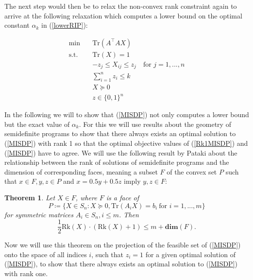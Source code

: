 \documentclass[a4paper,11pt,1p]{elsarticle}
\newtheorem{thm}{Theorem}
\newcommand{\define}{\coloneqq}
\newcommand{\T}{^{\top}}
\newcommand{\Tr}{\text{Tr}}
\newcommand{\Rk}{\text{Rk}}
\begin{document}
The next step would then be to relax the non-convex rank constraint again to arrive at the following relaxation which computes a lower bound on the optimal constant $\alpha_k$ in (\ref{lowerRIP}):

\begin{align}\label{MISDP}
 \min \quad & \Tr(A\T A X) \nonumber \\
 \text{s.t.} \quad & \Tr(X) = 1 \nonumber \\
 & -z_j \leq X_{ij} \leq z_j \quad \text{for } j = 1, ..., n \nonumber \\
 & \sum_{i=1}^n z_i \leq k \tag{MISDP} \\
 & X \succeq 0  \nonumber \\
 & z \in \{0,1\}^n \nonumber
\end{align}

In the following we will to show that (\ref{MISDP}) not only computes a lower bound but the exact value of $\alpha_k$. For this we will use results about the geometry of semidefinite programs to show that there always exists an 
optimal solution to (\ref{MISDP}) with rank 1 so that the optimal objective values of (\ref{Rk1MISDP}) and (\ref{MISDP}) have to agree. We will use the following result by Pataki \cite{pat98} about the relationship between the rank of
solutions of semidefinite programs and the dimension of corresponding faces, meaning a subset $F$ of the convex set $P$ such that \mbox{$x \in F, y, z \in P$} and $x = 0.5y + 0.5z$ imply $y,z \in F$:

\begin{thm}\label{patakiLemma}
 Let $X \in F$, where $F$ is a face of
 \begin{equation*}
 P \define \{X \in S_n : X \succeq 0, \Tr(A_i X) = b_i \ \text{for } i = 1, ..., m\}
 \end{equation*}
 for symmetric matrices $A_i \in S_n, i \leq m$. Then
 \begin{equation*}
  \frac{1}{2}\Rk(X)\cdot(\Rk(X)+1) \leq m + \textbf{dim}(F).
 \end{equation*}
\end{thm}

Now we will use this theorem on the projection of the feasible set of (\ref{MISDP}) onto the space of all indices $i$, such that $z_i = 1$ for a given optimal solution of (\ref{MISDP}), to show that there always exists an optimal 
solution to (\ref{MISDP}) with rank one.
\end{document}
